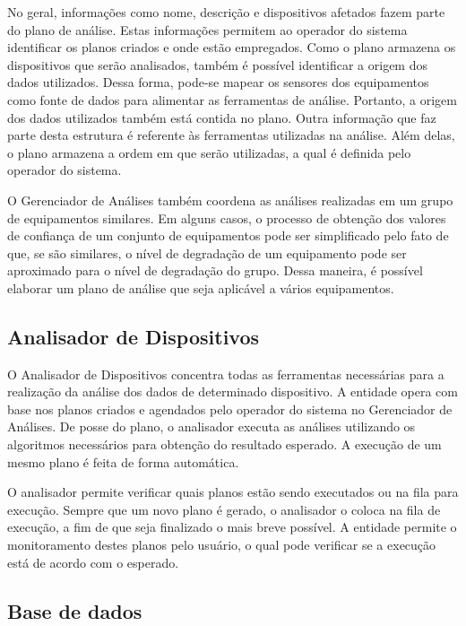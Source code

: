 No geral, informações como nome, descrição e dispositivos afetados fazem parte do plano de análise.
Estas informações permitem ao operador do sistema identificar os planos criados e onde estão
empregados. Como o plano armazena os dispositivos que serão analisados, também é possível
identificar a origem dos dados utilizados. Dessa forma, pode-se mapear os sensores dos equipamentos
como fonte de dados para alimentar as ferramentas de análise. Portanto, a origem dos dados
utilizados também está contida no plano. Outra informação que faz parte desta estrutura é referente
às ferramentas utilizadas na análise. Além delas, o plano armazena a ordem em que serão utilizadas,
a qual é definida pelo operador do sistema.


O Gerenciador de Análises também coordena as análises realizadas em um grupo de equipamentos
similares. Em alguns casos, o processo de obtenção dos valores de confiança de um conjunto de
equipamentos pode ser simplificado pelo fato de que, se são similares, o nível de degradação de um
equipamento pode ser aproximado para o nível de degradação do grupo. Dessa maneira, é possível
elaborar um plano de análise que seja aplicável a vários equipamentos.


\subsection{Analisador de Dispositivos}
\label{sub:proposta-analisador-dispositivos}

O Analisador de Dispositivos concentra todas as ferramentas necessárias para a realização da análise
dos dados de determinado dispositivo. A entidade opera com base nos planos criados e agendados pelo
operador do sistema no Gerenciador de Análises. De posse do plano, o analisador executa as análises
utilizando os algoritmos necessários para obtenção do resultado esperado. A execução de um mesmo
plano é feita de forma automática.

O analisador permite verificar quais planos estão sendo executados ou na fila para execução. Sempre
que um novo plano é gerado, o analisador o coloca na fila de execução, a fim de que seja finalizado
o mais breve possível. A entidade permite o monitoramento destes planos pelo usuário, o qual pode
verificar se a execução está de acordo com o esperado.


\subsection{Base de dados}
\label{sub:proposta-base-dados}

